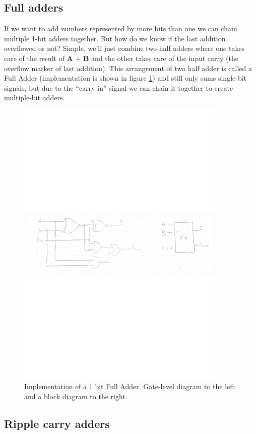 \documentclass[a4paper,11pt]{report}
\begin{document}
\subsection{Full adders}

If we want to add numbers represented by more bits than one we can
chain multiple 1-bit adders together. But how do we know if the last
addition overflowed or not? Simple, we'll just combine two half adders
where one takes care of the result of \textbf{A} + \textbf{B} and the
other takes care of the input carry (the overflow marker of last
addition).  This arrangement of two half adder is called a Full Adder
(implementation is shown in figure \ref{fig:fa}) and still only sums
single-bit signals, but due to the ``carry in''-signal we can chain it
together to create multiple-bit adders.

\begin{figure}[H]
  \centering
  \includegraphics[width=10cm]{images/FA.pdf}
  \caption{Implementation of a 1 bit Full Adder. Gate-level diagram to the left and a block diagram to the right.}
  \label{fig:fa}
\end{figure}

\subsection{Ripple carry adders}
\end{document}
